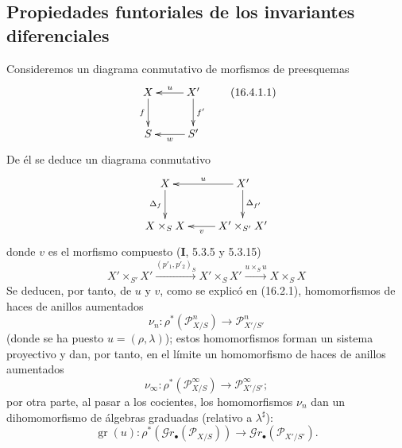 \subsection{Propiedades funtoriales de los invariantes diferenciales}
\label{IV.16.4}

\begin{env}[16.4.1]
\label{IV.16.4.1}
Consideremos un diagrama conmutativo de morfismos de preesquemas
\[
  \xymatrix{
    X \ar[d]_-{f} & X' \ar[l]_-u \ar[d]^-{f'} \\
    S & S' \ar[l]^-w
  }
  \tag{16.4.1.1}
  \label{IV.16.4.1.1}
\]
De él se deduce un diagrama conmutativo
\[
  \xymatrix{
    X \ar[d]_-{\Delta_f} & X' \ar[l]_-u \ar[d]^-{\Delta_{f'}} \\
    X\times_S X & X'\times_{S'}X' \ar[l]^-v
  }
\]
donde $v$ es el morfismo compuesto (\textbf I, 5.3.5 y 5.3.15)
\[
  X'\times_{S'}X'
  \xrightarrow{(p'_1,p'_2)_S}X'\times_S X'
  \xrightarrow{u\times_S u}X\times_S X
  \tag{16.4.1.2}
  \label{IV.16.4.1.2}
\]
Se deducen, por tanto, de $u$ y $v$, como se explicó en (16.2.1),
homomorfismos de haces de anillos aumentados
\[
  \nu_n:\rho^*(\mathscr{P}_{X/S}^n)\longrightarrow
  \mathscr{P}_{X'/S'}^n
  \tag{16.4.1.3}
  \label{IV.16.4.1.3}
\]
(donde se ha puesto $u=(\rho,\lambda)$); estos homomorfismos forman un sistema
proyectivo y dan, por tanto, en el límite un homomorfismo de haces de anillos
aumentados
\[
  \nu_\infty:\rho^*(\mathscr{P}_{X/S}^\infty)\longrightarrow
  \mathscr{P}_{X'/S'}^\infty;
  \tag{16.4.1.4}
  \label{IV.16.4.1.4}
\]
por otra parte, al pasar a los cocientes, los homomorfismos $\nu_n$ dan un
dihomomorfismo de álgebras graduadas (relativo a $\lambda^\sharp$):
\[
  \operatorname{gr}(u):\rho^*(\mathscr{G}r_\bullet(\mathscr{P}_{X/S}))
  \longrightarrow\mathscr{G}r_\bullet(\mathscr{P}_{X'/S'}).
  \tag{16.4.1.5}
  \label{IV.16.4.1.5}
\]
\end{env}


